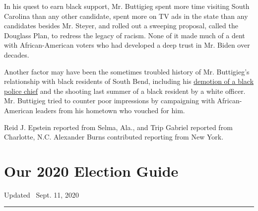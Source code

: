 In his quest to earn black support, Mr. Buttigieg spent more time
visiting South Carolina than any other candidate, spent more on TV ads
in the state than any candidates besides Mr. Steyer, and rolled out a
sweeping proposal, called the Douglass Plan, to redress the legacy of
racism. None of it made much of a dent with African-American voters who
had developed a deep trust in Mr. Biden over decades.

Another factor may have been the sometimes troubled history of Mr.
Buttigieg's relationship with black residents of South Bend, including
his
\href{https://www.nytimes3xbfgragh.onion/2019/04/19/us/politics/buttigieg-black-police-chief-fired.html}{demotion
of a black police chief} and the shooting last summer of a black
resident by a white officer. Mr. Buttigieg tried to counter poor
impressions by campaigning with African-American leaders from his
hometown who vouched for him.

Reid J. Epstein reported from Selma, Ala., and Trip Gabriel reported
from Charlotte, N.C. Alexander Burns contributed reporting from New
York.

\hypertarget{our-2020-election-guide}{%
\section{Our 2020 Election Guide}\label{our-2020-election-guide}}

Updated ~Sept. 11, 2020

\begin{center}\rule{0.5\linewidth}{\linethickness}\end{center}

